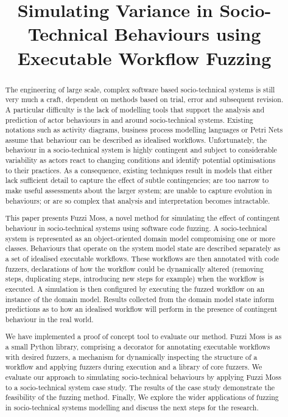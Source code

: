\documentclass{sig-alternate}
\title{Simulating Variance in Socio-Technical Behaviours using Executable Workflow Fuzzing}
\begin{document}

\maketitle


\begin{abstract}
  The engineering of large scale, complex software based socio-technical systems
  is still very much a craft, dependent on methods based on trial, error and
  subsequent revision.  A particular difficulty is the lack of modelling tools
  that support the analysis and prediction of actor behaviours in and around
  socio-technical systems.  Existing notations such as activity diagrams,
  business process modelling languages or Petri Nets assume that behaviour can
  be described as idealised workflows.  Unfortunately, the behaviour in a
  socio-technical system is highly contingent and subject to considerable
  variability as actors react to changing conditions and identify potential
  optimisations to their practices.  As a consequence, existing techniques
  result in models that either lack sufficient detail to capture the effect of
  subtle contingencies; are too narrow to make useful assessments about the
  larger system; are unable to capture evolution in behaviours; or are so
  complex that analysis and interpretation becomes intractable.

  This paper presents Fuzzi Moss, a novel method for simulating the effect of
  contingent behaviour in socio-technical systems using software code fuzzing.
  A socio-technical system is represented as an object-oriented domain model
  compromising one or more classes.  Behaviours that operate on the system model
  state are described separately as a set of idealised executable workflows.
  These workflows are then annotated with code fuzzers, declarations of how the
  workflow could be dynamically altered (removing steps, duplicating steps,
  introducing new steps for example) when the workflow is executed.  A
  simulation is then configured by executing the fuzzed workflow on an instance
  of the domain model.  Results collected from the domain model state inform
  predictions as to how an idealised workflow will perform in the presence of
  contingent behaviour in the real world.
 
  We have implemented a proof of concept tool to evaluate our method. Fuzzi Moss
  is as a small Python library, comprising a decorator for annotating executable
  workflows with desired fuzzers, a mechanism for dynamically inspecting the
  structure of a workflow and applying fuzzers during execution and a library of
  core fuzzers.  We evaluate our approach to simulating socio-technical
  behaviours by applying Fuzzi Moss to a socio-technical system case study.  The
  results of the case study demonstrate the feasibility of the fuzzing method.
  Finally, We explore the wider applications of fuzzing in socio-technical
  systems modelling and discuss the next steps for the research.
\end{abstract}
\end{document}
